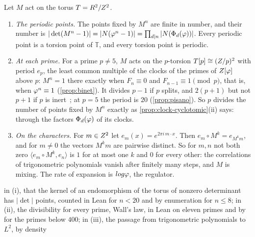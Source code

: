 \begin{proposition}\label{prop:two-faces}
Let $M$ act on the torus $T=R^2/Z^2$.
\begin{enumerate}[label=\textup{(\roman*)}]
  \item \emph{The periodic points.}  The points fixed by $M^n$ are finite in number, and their number is
    $|\det(M^n-1)|=|N(\varphi^n-1)|=\prod_{d\mid n}|N(\Phi_d(\varphi))|$.  Every periodic point is a torsion point
    of $\mathbb T$, and every torsion point is periodic.
  \item \emph{At each prime.}  For a prime $p\neq5$, $M$ acts on the $p$-torsion $T[p]\cong(Z/p)^2$ with
    period $e_p$, the least common multiple of the clocks of the primes of $Z[\varphi]$ above $p$: $M^n=1$ there exactly
    when $F_n\equiv0$ and $F_{n-1}\equiv1\pmod p$, that is, when $\varphi^n\equiv1$ (\cref{prop:binet}).  It divides
    $p-1$ if $p$ splits, and $2(p+1)$ but not $p+1$ if $p$ is inert~\cite{wall60}; at $p=5$ the period is $20$
    (\cref{prop:pisano}).  So $p$ divides the number of points fixed by $M^n$ exactly as
    \cref{prop:clock-cyclotomic}(ii) says: through the factors $\Phi_d(\varphi)$ of its clocks.
  \item \emph{On the characters.}  For $m\in Z^2$ let $e_m(x)=e^{2\pi i\,m\cdot x}$.  Then $e_m\circ M^k=e_{M^km}$, and
    for $m\neq0$ the vectors $M^km$ are pairwise distinct.  So for $m,n$ not both zero
    $\langle e_m\circ M^k,e_n\rangle$ is $1$ for at most one $k$ and $0$ for every other: the correlations of
    trigonometric polynomials vanish after finitely many steps, and $M$ is mixing.  The rate of expansion is
    $log\varphi$, the regulator.
\end{enumerate}


in (i), that the kernel of an
endomorphism of the torus of nonzero determinant has $|\det|$ points, counted in Lean for $n<20$ and by
enumeration for $n\le8$; in (ii), the divisibility for every prime, Wall's law, in Lean on eleven primes and
by  for the primes below $400$; in (iii), the passage from trigonometric polynomials to
$L^2$, by density
\end{proposition}

